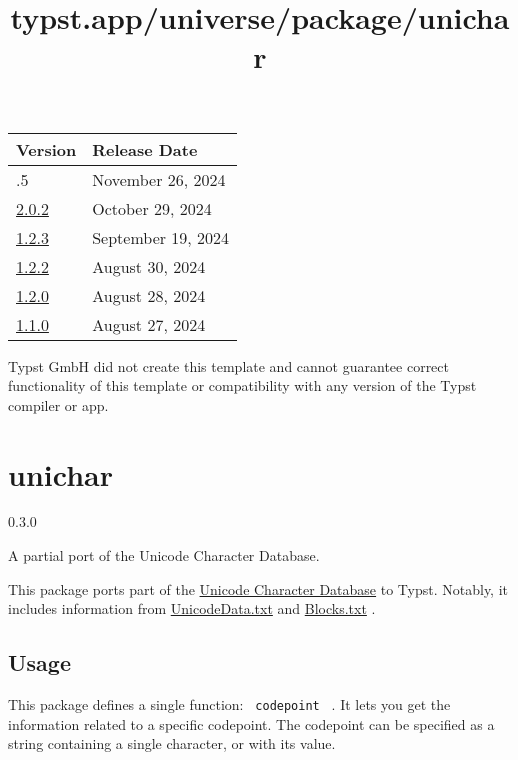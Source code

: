 \begin{longtable}[]{@{}ll@{}}
\toprule\noalign{}
Version & Release Date \\
\midrule\noalign{}
\endhead
\bottomrule\noalign{}
\endlastfoot
2.0.5 & November 26, 2024 \\
\href{https://typst.app/universe/package/fh-joanneum-iit-thesis/2.0.2/}{2.0.2}
& October 29, 2024 \\
\href{https://typst.app/universe/package/fh-joanneum-iit-thesis/1.2.3/}{1.2.3}
& September 19, 2024 \\
\href{https://typst.app/universe/package/fh-joanneum-iit-thesis/1.2.2/}{1.2.2}
& August 30, 2024 \\
\href{https://typst.app/universe/package/fh-joanneum-iit-thesis/1.2.0/}{1.2.0}
& August 28, 2024 \\
\href{https://typst.app/universe/package/fh-joanneum-iit-thesis/1.1.0/}{1.1.0}
& August 27, 2024 \\
\end{longtable}

Typst GmbH did not create this template and cannot guarantee correct
functionality of this template or compatibility with any version of the
Typst compiler or app.


\title{typst.app/universe/package/unichar}

\label{banner}
\section{unichar}\label{unichar}

{ 0.3.0 }

A partial port of the Unicode Character Database.

\label{readme}
This package ports part of the
\href{https://www.unicode.org/reports/tr44/}{Unicode Character Database}
to Typst. Notably, it includes information from
\href{https://unicode.org/reports/tr44/\#UnicodeData.txt}{UnicodeData.txt}
and \href{https://unicode.org/reports/tr44/\#Blocks.txt}{Blocks.txt} .

\subsection{Usage}\label{usage}

This package defines a single function: \texttt{\ codepoint\ } . It lets
you get the information related to a specific codepoint. The codepoint
can be specified as a string containing a single character, or with its
value.

